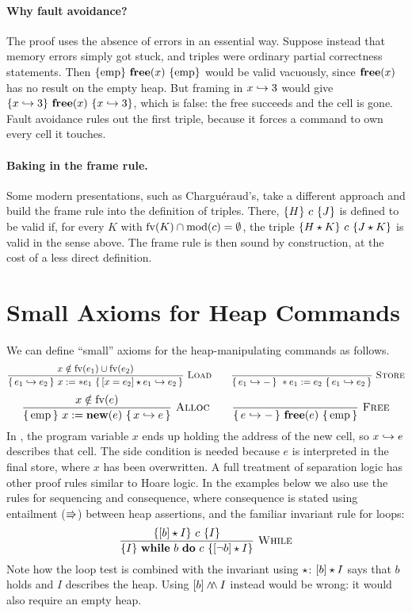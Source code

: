 \paragraph{Why fault avoidance?} The proof uses the absence of errors in an essential way. Suppose
instead that memory errors simply got stuck, and triples were ordinary partial correctness
statements. Then $\{\mathrm{emp}\}\ \mathbf{free}(x)\ \{\mathrm{emp}\}$ would be valid vacuously, since
$\mathbf{free}(x)$ has no result on the empty heap. But framing in $x\hookrightarrow 3$ would give
$\{x\hookrightarrow 3\}\ \mathbf{free}(x)\ \{x\hookrightarrow 3\}$, which is false: the free succeeds and the cell is gone.
Fault avoidance rules out the first triple, because it forces a command to own every cell it
touches.
%
\paragraph{Baking in the frame rule.} Some modern presentations, such as Chargu\'eraud's, take a
different approach and build the frame rule into the definition of triples. There,
$\{H\}\ c\ \{J\}$ is defined to be valid if, for every $K$ with $\mathrm{fv}(K)\cap\mathrm{mod}(c)=\emptyset$,
the triple $\{H\mathbin{\star} K\}\ c\ \{J\mathbin{\star} K\}$ is valid in the sense above. The frame rule is then sound
by construction, at the cost of a less direct definition.
%
\section{Small Axioms for Heap Commands}
%
We can define ``small'' axioms for the heap-manipulating commands as follows.
\[
  \dfrac{x\notin\mathrm{fv}(e_1)\cup\mathrm{fv}(e_2)}{\{\,e_1\hookrightarrow e_2\,\}\ x:=\ast e_1\ \{\,[x=e_2]\mathbin{\star} e_1\hookrightarrow e_2\,\}}\ \textsc{Load}
  \qquad
  \dfrac{}{\{\,e_1\hookrightarrow-\,\}\ \ast e_1:=e_2\ \{\,e_1\hookrightarrow e_2\,\}}\ \textsc{Store}
\]
\[
  \infr{x\notin\fv(e)}{\{\,\emp\,\}\ x:=\kw{new}(e)\ \{\,x\pto e\,\}}{Alloc}
  \qquad
  \infr{}{\{\,e\pto-\,\}\ \kw{free}(e)\ \{\,\emp\,\}}{Free}
\]
In , the program variable $x$ ends up holding the address of the new cell, so
$x\hookrightarrow e$ describes that cell. The side condition is needed because $e$ is interpreted in the final
store, where $x$ has been overwritten.
%
A full treatment of separation logic has other proof rules similar to Hoare logic. In the examples
below we also use the rules for sequencing and consequence, where consequence is stated using
entailment ($\Rrightarrow$) between heap assertions, and the familiar invariant rule for loops:
\[
  \dfrac{\{[b]\mathbin{\star} I\}\ c\ \{I\}}{\{I\}\ \mathbf{while}\ b\ \mathbf{do}\ c\ \{[\neg b]\mathbin{\star} I\}}\ \textsc{While}
\]
Note how the loop test is combined with the invariant using $\mathbin{\star}$: $[b]\mathbin{\star} I$ says that $b$
holds and $I$ describes the heap. Using $[b]\mathbin{\wedge\!\!\wedge} I$ instead would be wrong: it would also
require an empty heap.
%
